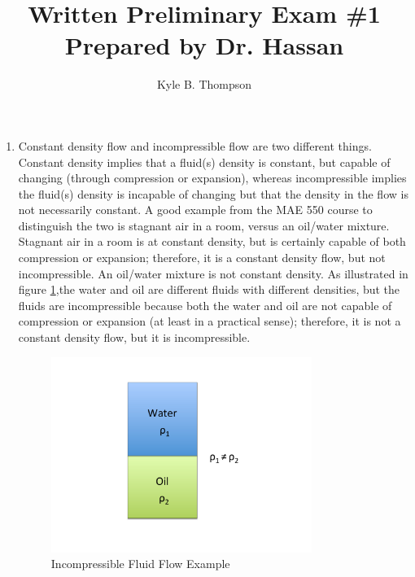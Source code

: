 \documentclass[a4paper]{article}
\title{Written Preliminary Exam \#1 \break
       Prepared by Dr. Hassan}
\author{ Kyle B. Thompson }
\begin{document}
\maketitle

\begin{enumerate}
  \item Constant density flow and incompressible flow are two different things.
    Constant density implies that a fluid(s) density is constant, but capable of
    changing (through compression or expansion), whereas incompressible implies
    the fluid(s) density is incapable of changing but that the density in the
    flow is not necessarily constant.  A good example from the MAE 550 course to
    distinguish the two is stagnant air in a room, versus an oil/water mixture.
    Stagnant air in a room is at constant density, but is certainly capable of
    both compression or expansion; therefore, it is a constant density flow, but
    not incompressible.  An oil/water mixture is not constant density.  As
    illustrated in figure \ref{fig:incompressible},the water and oil are
    different fluids with different densities, but the fluids are incompressible
    because both the water and oil are not capable of compression or expansion
    (at least in a practical sense); therefore, it is not a constant density
    flow, but it is incompressible.

    \begin{figure}[h]
      \centering
      \includegraphics[width=0.8\textwidth,trim={0 2cm 0 2cm},clip]{oil_water_fig}
      \caption{Incompressible Fluid Flow Example}
      \label{fig:incompressible}
    \end{figure}


\end{enumerate}
\end{document}
